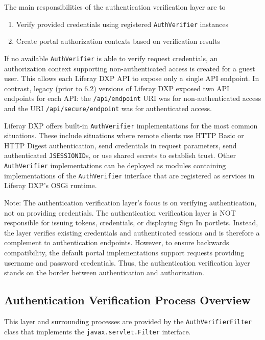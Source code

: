 The main responsibilities of the authentication verification layer are
to

\begin{enumerate}
\def\labelenumi{\arabic{enumi}.}
\tightlist
\item
  Verify provided credentials using registered \texttt{AuthVerifier}
  instances
\item
  Create portal authorization contexts based on verification results
\end{enumerate}

If no available \texttt{AuthVerifier} is able to verify request
credentials, an authorization context supporting non-authenticated
access is created for a guest user. This allows each Liferay DXP API to
expose only a single API endpoint. In contrast, legacy (prior to 6.2)
versions of Liferay DXP exposed two API endpoints for each API: the
\texttt{/api/endpoint} URI was for non-authenticated access and the URI
\texttt{/api/secure/endpoint} was for authenticated access.

Liferay DXP offers built-in \texttt{AuthVerifier} implementations for
the most common situations. These include situations where remote
clients use HTTP Basic or HTTP Digest authentication, send credentials
in request parameters, send authenticated \texttt{JSESSIONID}s, or use
shared secrets to establish trust. Other \texttt{AuthVerifier}
implementations can be deployed as modules containing implementations of
the \texttt{AuthVerifier} interface that are registered as services in
Liferay DXP's OSGi runtime.

Note: The authentication verification layer's focus is on verifying
authentication, not on providing credentials. The authentication
verification layer is NOT responsible for issuing tokens, credentials,
or displaying Sign In portlets. Instead, the layer verifies existing
credentials and authenticated sessions and is therefore a complement to
authentication endpoints. However, to ensure backwards compatibility,
the default portal implementations support requests providing username
and password credentials. Thus, the authentication verification layer
stands on the border between authentication and authorization.

\subsection{Authentication Verification Process
Overview}\label{authentication-verification-process-overview}

This layer and surrounding processes are provided by the
\texttt{AuthVerifierFilter} class that implements the
\texttt{javax.servlet.Filter} interface.

